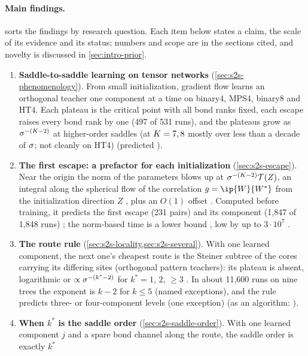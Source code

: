 \paragraph{Main findings.}
 sorts the findings by research question. Each item below states a claim, the scale of its evidence and its status; numbers and scope are in the
sections cited, and novelty is discussed in \cref{sec:intro-prior}.
\begin{enumerate}[label=\arabic*.,ref=\arabic*,leftmargin=*,itemsep=2pt]
  \item\label{it:intro-s2s} \textbf{Saddle-to-saddle learning on tensor networks}
    (\cref{sec:s2s-phenomenology}). From small initialization, gradient flow learns an orthogonal teacher
    one component at a time on binary4, MPS4, binary8 and HT4. Each plateau is the critical point with all
    bond ranks fixed, each escape raises every bond rank by one (497 of 531 runs), and the plateaus grow as
    $\sigma^{-(K-2)}$ at higher-order saddles (at $K=7,8$ mostly over less than a decade of $\sigma$; not
    cleanly on HT4) \empirical{}
    (predicted \derived).
  \item\label{it:intro-first} \textbf{The first escape: a prefactor for each initialization}
    (\cref{sec:s2s-escape}). Near the origin the norm of the parameters blows up at
    $\sigma^{-(K-2)}\mathcal{T}(Z)$, an integral along the spherical flow of the correlation $g=\ip{\W}{\Wt}$ from
    the initialization direction $Z$ \proven, plus an $O(1)$ offset \derived. Computed before training, it
    predicts the first escape (231 pairs) and its component (1,847 of 1,848 runs) \empirical; the
    norm-based time is a lower bound \proven, low by up to $3\cdot10^7$ \empirical.
  \item\label{it:intro-route} \textbf{The route rule}
    (\cref{sec:s2s-locality,sec:s2s-several}). With one learned component, the next one's cheapest route
    is the Steiner subtree of the cores carrying its differing sites \proven{}
    (orthogonal pattern teachers): its plateau is absent, logarithmic or $\propto\sigma^{-(k^*-2)}$ for
    $k^*=1$, $2$, $\ge3$ \derived. In about 11,600 runs on nine trees the exponent is $k-2$ for $k\le5$
    (named exceptions), and the rule predicts three- or four-component levels (one exception)
    \empirical{} (as an algorithm: \conjecture).
  \item\label{it:intro-order-thm} \textbf{When $k^*$ is the saddle order} (\cref{sec:s2s-saddle-order}). With
    one learned component $j$ and a spare bond channel along the route, the saddle order is exactly $k^*$

\end{enumerate}

